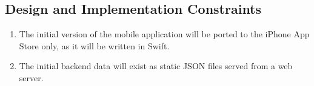 % 

% 

\subsection{Design and Implementation Constraints}
\begin{enumerate}
\item The initial version of the mobile application will be ported to
the iPhone App Store only, as it will be written in Swift.
\item The initial backend data will exist as static JSON files
  served from a web server.
\end{enumerate}
